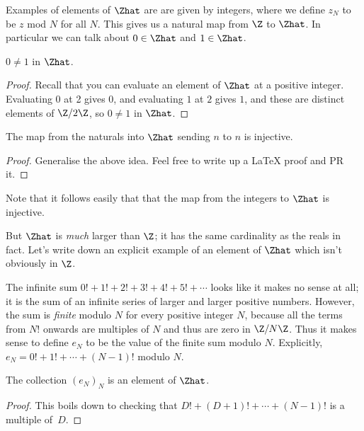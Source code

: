 Examples of elements of $\Zhat$ are are given by integers, where we define $z_N$ to be $z$
mod $N$ for all $N$. This gives us a natural map from $\Z$ to $\Zhat$. In particular we
can talk about $0\in\Zhat$ and $1\in\Zhat$.

\begin{lemma}
    \label{ZHat.nontrivial}
    \leanok
    $0\not=1$ in $\Zhat$.
\end{lemma}
\begin{proof}
    \leanok
    Recall that you can evaluate an element of $\Zhat$ at a positive integer.
    Evaluating $0$ at 2 gives $0$, and evaluating $1$ at $2$ gives $1$, and these
    are distinct elements of $\Z/2\Z$, so $0\not=1$ in $\Zhat$.
\end{proof}

\begin{lemma}
    \label{ZHat.charZero}
    \leanok
    The map from the naturals into $\Zhat$ sending $n$ to $n$ is injective.
\end{lemma}
\begin{proof}
    \leanok
    Generalise the above idea. Feel free to write up a LaTeX proof and PR it.
\end{proof}

Note that it follows easily that that the map from the integers to $\Zhat$ is injective.

But $\Zhat$
is \emph{much} larger than $\Z$; it has the same cardinality as the reals in fact.
Let's write down an explicit example of an element of $\Zhat$ which isn't obviously in $\Z$.

\begin{definition}
    \label{ZHat.e}
    \leanok
    The infinite sum $0!+1!+2!+3!+4!+5!+\cdots$ looks
    like it makes no sense at all; it is the sum of an infinite series of larger and larger
    positive numbers.
    However, the sum is \emph{finite} modulo $N$ for every positive integer $N$, because
    all the terms from $N!$ onwards are multiples of $N$ and thus are zero in $\Z/N\Z$.
    Thus it makes sense to define $e_N$ to be the value of the finite sum modulo $N$.
    Explicitly, $e_N=0!+1!+\cdots+(N-1)!$ modulo $N$.
\end{definition}

\begin{lemma}
    \label{ZHat.e_def}
    \leanok
    The collection $(e_N)_N$ is an element of $\Zhat$.
\end{lemma}
\begin{proof}
    \leanok
    This boils down to checking that $D!+(D+1)!+\cdots+(N-1)!$ is a multiple of~$D$.
\end{proof}

